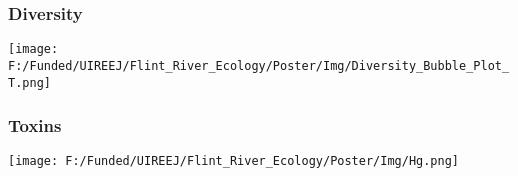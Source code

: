 \documentclass[10pt]{beamer}
\begin{document}



\begin{frame}
    \frametitle{Diversity} %
    \begin{center} 
        \texttt{[image: F:/Funded/UIREEJ/Flint\_River\_Ecology/Poster/Img/Diversity\_Bubble\_Plot\_T.png]} \\
    \end{center}
    
\end{frame}



\begin{frame}
    \frametitle{Toxins} %
    \begin{center}
        \texttt{[image: F:/Funded/UIREEJ/Flint\_River\_Ecology/Poster/Img/Hg.png]} \\
    \end{center}
    
\end{frame}
\end{document}
